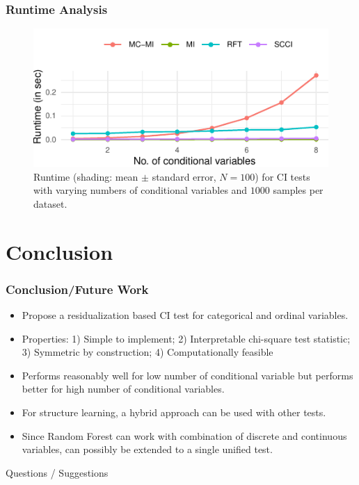 \documentclass{beamer}
\begin{document}
\begin{frame}
	\frametitle{Runtime Analysis}
	\begin{figure}
		\centering
		\includegraphics{imgs/runtime.pdf}
		\caption*{Runtime (shading: mean $\pm$ standard error, $N=100$)
		for CI tests with varying numbers of conditional variables and
		$1000$ samples per dataset.
		}
	\end{figure}
\end{frame}

\section{Conclusion}
\begin{frame}
	\frametitle{Conclusion/Future Work}
	\begin{itemize}
		\setlength\itemsep{1em}
		\item Propose a residualization based CI test for categorical and ordinal variables.
		\item Properties: 1) Simple to implement; 2) Interpretable chi-square test statistic; 3) Symmetric by construction; 4) Computationally feasible
		\item Performs reasonably well for low number of
			conditional variable but performs better for high
			number of conditional variables.
		\item For structure learning, a hybrid approach can be used with other
			tests.
		\item Since Random Forest can work with combination of discrete and 
			continuous variables, can possibly be extended to a single 
			unified test.
	\end{itemize}
\end{frame}

\begin{frame}
	\begin{center}
		\Huge{Questions / Suggestions}
	\end{center}
\end{frame}
\end{document}
